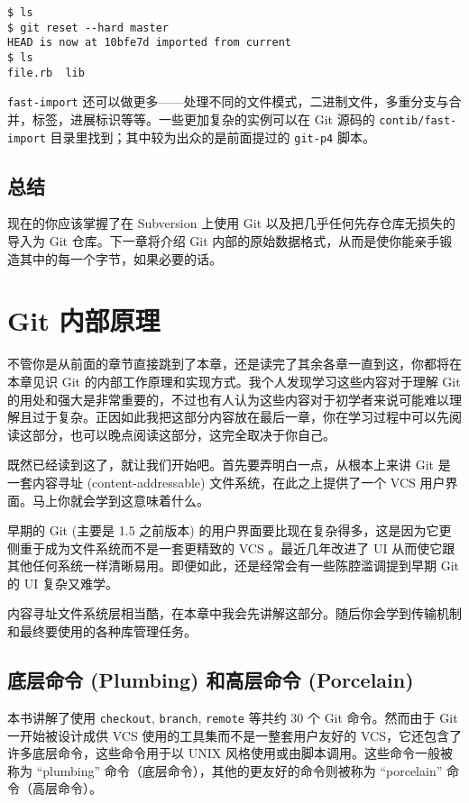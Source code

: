 \documentclass[a4paper]{book}
\newcommand{\chap}[1]{\newpage\thispagestyle{empty}\chapter{#1}\label{chap:\thechapter}}
\begin{document}
\begin{shaded}\begin{verbatim}
$ ls
$ git reset --hard master
HEAD is now at 10bfe7d imported from current
$ ls
file.rb  lib
\end{verbatim}\end{shaded}

\texttt{fast-import} 还可以做更多------处理不同的文件模式，二进制文件，多重分支与合并，标签，进展标识等等。一些更加复杂的实例可以在 Git 源码的 \texttt{contib/fast-import} 目录里找到；其中较为出众的是前面提过的 \texttt{git-p4} 脚本。

\section{总结}

现在的你应该掌握了在 Subversion 上使用 Git 以及把几乎任何先存仓库无损失的导入为 Git 仓库。下一章将介绍 Git 内部的原始数据格式，从而是使你能亲手锻造其中的每一个字节，如果必要的话。

\chap{Git 内部原理}

不管你是从前面的章节直接跳到了本章，还是读完了其余各章一直到这，你都将在本章见识 Git 的内部工作原理和实现方式。我个人发现学习这些内容对于理解 Git 的用处和强大是非常重要的，不过也有人认为这些内容对于初学者来说可能难以理解且过于复杂。正因如此我把这部分内容放在最后一章，你在学习过程中可以先阅读这部分，也可以晚点阅读这部分，这完全取决于你自己。

既然已经读到这了，就让我们开始吧。首先要弄明白一点，从根本上来讲 Git 是一套内容寻址 (content-addressable) 文件系统，在此之上提供了一个 VCS 用户界面。马上你就会学到这意味着什么。

早期的 Git (主要是 1.5 之前版本) 的用户界面要比现在复杂得多，这是因为它更侧重于成为文件系统而不是一套更精致的 VCS 。最近几年改进了 UI 从而使它跟其他任何系统一样清晰易用。即便如此，还是经常会有一些陈腔滥调提到早期 Git 的 UI 复杂又难学。

内容寻址文件系统层相当酷，在本章中我会先讲解这部分。随后你会学到传输机制和最终要使用的各种库管理任务。

\section{底层命令 (Plumbing) 和高层命令 (Porcelain)}

本书讲解了使用 \texttt{checkout}, \texttt{branch}, \texttt{remote} 等共约 30 个 Git 命令。然而由于 Git 一开始被设计成供 VCS 使用的工具集而不是一整套用户友好的 VCS，它还包含了许多底层命令，这些命令用于以 UNIX 风格使用或由脚本调用。这些命令一般被称为 “plumbing” 命令（底层命令），其他的更友好的命令则被称为 “porcelain” 命令（高层命令）。
\end{document}
